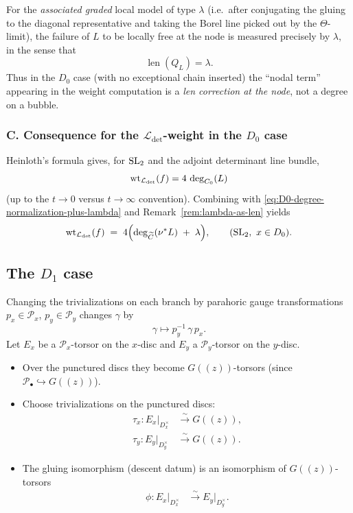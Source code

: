\documentclass[12pt]{article}
\DeclareMathOperator{\len}{len}
\begin{document}
\begin{remark}
\label{rem:lambda-as-len}
For the \emph{associated graded} local model of type $\lambda$ (i.e.\ after
conjugating the gluing to the diagonal representative and taking the Borel line
picked out by the $\Theta$-limit), the failure of $L$ to be locally free at the
node is measured precisely by $\lambda$, in the sense that
\[
\len(Q_L)=\lambda.
\]
Thus in the $D_0$ case (with no exceptional chain inserted) the ``nodal term''
appearing in the weight computation is a \emph{len correction at the node},
not a degree on a bubble.
\end{remark}

\subsubsection*{C. Consequence for the $\mathcal L_{\det}$-weight in the $D_0$ case}

Heinloth's formula gives, for $\operatorname{SL}_2$ and the adjoint determinant line bundle,
\[
\operatorname{wt}_{{\mathcal{L}}_{\det}}(f)=4\,\deg_{C_0}(L)
\]
(up to the $t\to 0$ versus $t\to\infty$ convention). Combining with
\eqref{eq:D0-degree-normalization-plus-lambda} and
Remark~\ref{rem:lambda-as-len} yields
\[
\operatorname{wt}_{{\mathcal{L}}_{\det}}(f)
\;=\;
4\Bigl(\deg_{\widetilde C}(\nu^*L)\;+\;\lambda\Bigr),
\qquad (\operatorname{SL}_2,\ x\in D_0).
\]


\subsection{The $D_1$ case}
Changing the trivializations on each branch by parahoric gauge transformations $p_x\in \mathcal P_x$, $p_y\in \mathcal P_y$ changes $\gamma$ by
\[
\gamma \mapsto p_y^{-1}\,\gamma\,p_x.
\]
    Let $E_x$ be a $\mathcal{P}_x$-torsor on the $x$-disc and $E_y$ a $\mathcal{P}_y$-torsor on the $y$-disc.
    \begin{itemize}
        \item Over the punctured discs they become $G((z))$-torsors (since $\mathcal{P}_{\bullet} \hookrightarrow G((z))$).
        \item Choose trivializations on the punctured discs:
        \begin{align*}
            \tau_x: E_x|_{D_x^\times} &\xrightarrow{\sim} G((z)),\\
            \tau_y: E_y|_{D_y^\times} &\xrightarrow{\sim} G((z)).
        \end{align*}
        \item The gluing isomorphism (descent datum) is an isomorphism of $G((z))$-torsors
        \begin{align*}
            \phi: E_x|_{D_x^\times} &\xrightarrow{\sim} E_y|_{D_y^\times}.
        \end{align*}
    \end{itemize}
\end{document}
